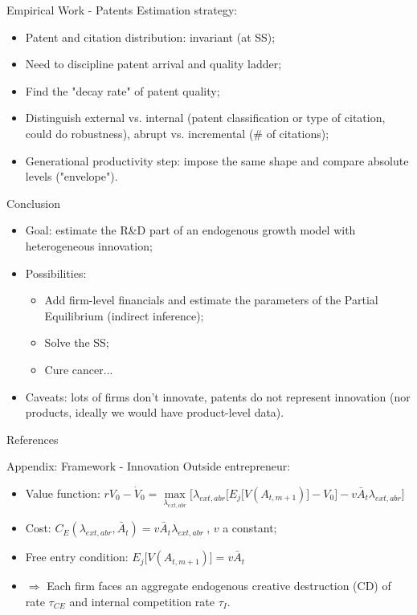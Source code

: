 \documentclass[11pt]{beamer}
\begin{document}
\begin{frame}{Empirical Work - Patents}
Estimation strategy:
	\begin{itemize}\itemsep12pt	
		\item Patent and citation distribution: invariant (at SS);
		\item Need to discipline patent arrival and quality ladder;
		\item Find the "decay rate" of patent quality;
		\item Distinguish external vs. internal (patent classification or type of citation, could do robustness), abrupt vs. incremental (\# of citations);
		\item Generational productivity step: impose the same shape and compare absolute levels ("envelope").
	\end{itemize}
\end{frame}

\begin{frame}{Conclusion}
\begin{itemize}\itemsep12pt	
		\item Goal: estimate the R\&D part of an endogenous growth model with heterogeneous innovation;
		\item Possibilities: 
		\begin{itemize}\itemsep12pt
			\item Add firm-level financials and estimate the parameters of the Partial Equilibrium (indirect inference);
			\item Solve the SS;
			\item Cure cancer...
		\end{itemize}
		\item Caveats: lots of firms don't innovate, patents do not represent innovation (nor products, ideally we would have product-level data).
	\end{itemize}
\end{frame}

\begin{frame}{References}
	\nocite{*}
	
\end{frame}

\begin{frame}{Appendix: Framework - Innovation}
Outside entrepreneur:
	\begin{itemize}\itemsep12pt	
	\item Value function: $rV_0 - \dot{V}_0 = \max\limits_{\lambda_{ext, abr}}\big[\lambda_{ext, abr}\big[E_j\big[V(A_{t, m+1})\big] - V_0\big] - v \bar{A}_{t}\lambda_{ext, abr}\big]$
 	\item Cost: $C_E(\lambda_{ext, abr}, \bar{A}_{t}) = v \bar{A}_{t} \lambda_{ext, abr}\:$, $v$ a constant;
	\item Free entry condition: $E_j\big[V(A_{t, m+1})\big] = v \bar{A}_{t}$
	\item $\Rightarrow$ Each firm faces an aggregate endogenous creative destruction (CD) of rate $\tau_{CE}$ and internal competition rate $\tau_I$.
	\end{itemize}
\end{frame}
\end{document}
